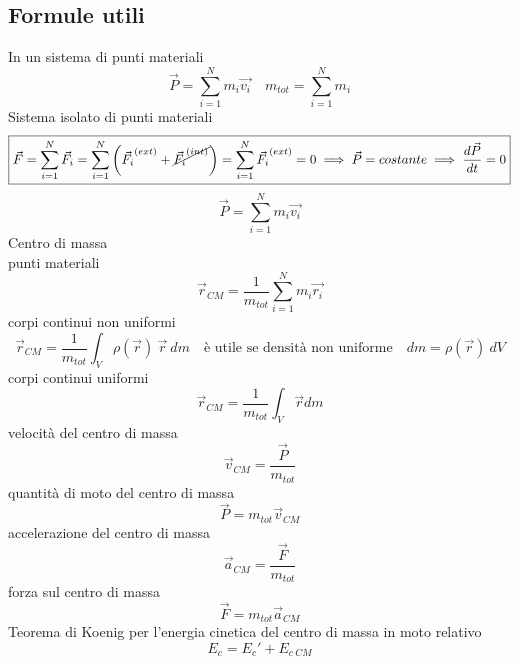 \documentclass[twoside]{article}
\begin{document}
\subsection{Formule utili}
In un sistema di punti materiali
\begin{equation*}
  \boxed{\vec{P} = \sum_{i=1}^{N} m_i \vec{v_i} \quad m_{tot} = \sum_{i=1}^{N} m_i}
\end{equation*}
Sistema isolato di punti materiali
\begin{equation*}
  \boxed{\vec{F} = \sum_{i=1}^{N} \vec{F_i} = \sum_{i=1}^{N} \left(\vec{F_i}^{(ext)} + \cancel{\vec{F_i}^{(int)}}\right) = \sum_{i=1}^{N} \vec{F_i}^{(ext)} = 0 \implies \vec{P} = costante \implies \frac{d \vec{P}}{dt} = 0}
\end{equation*}
\begin{equation*}
  \boxed{\vec{P} = \sum_{i=1}^{N} m_i \vec{v_i}}
\end{equation*}
Centro di massa\\
punti materiali
\begin{equation*}
  \boxed{\vec{r}_{CM} = \frac{1}{m_{tot}} \sum_{i=1}^{N} m_i \vec{r_i}}
\end{equation*}
corpi continui non uniformi
\begin{equation*}
  \boxed{\vec{r}_{CM} = \frac{1}{m_{tot}} \int_{V} \rho(\vec{r})\ \vec{r}\ dm \quad \text{è utile se densità non uniforme} \quad dm = \rho(\vec{r})\ dV}
\end{equation*}
corpi continui uniformi
\begin{equation*}
  \boxed{\vec{r}_{CM} = \frac{1}{m_{tot}} \int_{V} \vec{r} dm}
\end{equation*}
velocità del centro di massa
\begin{equation*}
  \boxed{\vec{v}_{CM} = \frac{\vec{P}}{m_{tot}}}
\end{equation*}
quantità di moto del centro di massa
\begin{equation*}
  \boxed{\vec{P} = m_{tot} \vec{v}_{CM}}
\end{equation*}
accelerazione del centro di massa
\begin{equation*}
  \boxed{\vec{a}_{CM} = \frac{\vec{F}}{m_{tot}}}
\end{equation*}
forza sul centro di massa
\begin{equation*}
  \boxed{\vec{F} = m_{tot} \vec{a}_{CM}}
\end{equation*}
Teorema di Koenig per l'energia cinetica del centro di massa in moto relativo
\begin{equation*}
  \boxed{E_c = E_c' + E_{c\ CM}}
\end{equation*}
\newpage
\hrulefill
\end{document}
